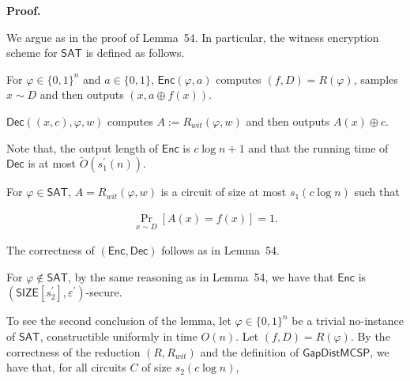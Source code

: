 \documentclass[10pt,a4paper]{article}
\begin{document}




\par\medskip\noindent\textbf{Proof.}\par




We argue as in the proof of Lemma 54. In particular, the witness encryption scheme for ${\mathsf{SAT}}$ is defined as follows.\par



For $\varphi\in\{0,1\}^{n}$ and $a\in\{0,1\}$, ${\mathsf{Enc}}(\varphi,a)$ computes $(f,D)=R(\varphi)$, samples $x\sim D$ and then outputs $(x,a\oplus f(x))$.\par




${\mathsf{Dec}}((x,c),\varphi,w)$ computes $A:=R_{wit}(\varphi,w)$ and then outputs $A(x)\oplus c$.\par



Note that, the output length of ${\mathsf{Enc}}$ is $c\log n+1$ and that the running time of ${\mathsf{Dec}}$ is at most $\widetilde{O}(s_{1}^{\prime}(n))$.\par




For $\varphi\in{\mathsf{SAT}}$, $A=R_{wit}(\varphi,w)$ is a circuit of size at most $s_{1}(c\log n)$ such that\par


\[\begin{gathered}
\Pr_{x\sim D}[A(x)=f(x)]=1.
\end{gathered}\]


The correctness of $({\mathsf{Enc}},{\mathsf{Dec}})$ follows as in Lemma 54.\par




For $\varphi\notin{\mathsf{SAT}}$, by the same reasoning as in Lemma 54, we have that ${\mathsf{Enc}}$ is $({\mathsf{SIZE}}[s_{2}^{\prime}],\varepsilon^{\prime})$-secure.\par




To see the second conclusion of the lemma, let $\varphi\in\{0,1\}^{n}$ be a trivial no-instance of ${\mathsf{SAT}}$, constructible uniformly in time $O(n)$. Let $(f,D)=R(\varphi)$. By the correctness of the reduction $(R,R_{wit})$ and the definition of ${\mathsf{GapDistMCSP}}$, we have that, for all circuits $C$ of size $s_{2}(c\log n)$,\par
\end{document}
